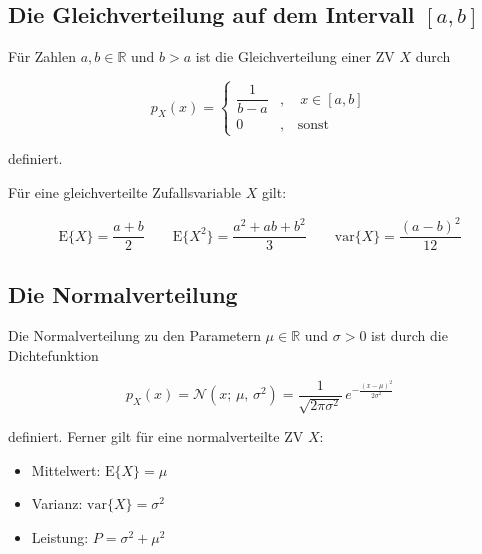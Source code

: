 \subsection{Die Gleichverteilung auf dem Intervall $[a,b]$}
\label{sec:gleichverteilung}

\begin{definition}
Für Zahlen $a, b \in \mathbb{R}$ und $b > a$ ist die Gleichverteilung einer ZV $X$ durch

$$
p_X(x) = \begin{cases} \dfrac{1}{b - a} & , \quad x \in [a, b] \\ 0 & , \quad \text{sonst} \end{cases}
$$

definiert.



Für eine gleichverteilte Zufallsvariable $X$ gilt:

$$
\mathrm{E}\{X\} = \frac{a + b}{2} \qquad \mathrm{E}\{X^2\} = \frac{a^2 + ab + b^2}{3} \qquad \mathrm{var}\{X\} = \frac{(a-b)^2}{12}
$$
\end{definition}

\subsection{Die Normalverteilung}
\label{sec:normalverteilung}

\begin{definition}[Normalverteilung]
Die Normalverteilung zu den Parametern $\mu \in \mathbb{R}$ und $\sigma > 0$ ist durch die Dichtefunktion

$$
p_X(x) = \mathcal{N}(x;\, \mu,\, \sigma^2) = \frac{1}{\sqrt{2\pi\sigma^2}}\, e^{-\frac{(x-\mu)^2}{2\sigma^2}}
$$

definiert. Ferner gilt für eine normalverteilte ZV $X$:

\begin{itemize}
  \item Mittelwert: $\mathrm{E}\{X\} = \mu$
  \item Varianz: $\mathrm{var}\{X\} = \sigma^2$
  \item Leistung: $P = \sigma^2 + \mu^2$
\end{itemize}
\end{definition}

